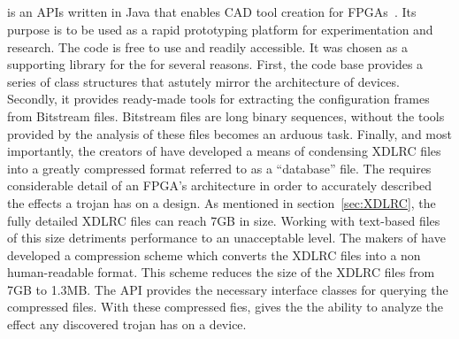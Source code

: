 \subsection{\RapidSmith} \label{sec:rapidSmith}
\RapidSmith is an \acrfull{APIs} written in Java that enables \acrfull{CAD} tool creation for \Xilinx \acrshort{FPGA}s~\cite{rapidSmith}.
Its purpose is to be used as a rapid prototyping platform for experimentation and research.
The code is free to use and readily accessible.
It was chosen as a supporting library for the \NameNoPeriod for several reasons.
First, the code base provides a series of class structures that astutely mirror the architecture of \Xilinx devices.
Secondly, it provides ready-made tools for extracting the configuration frames from \gls{Bitstream} files. 
\gls{Bitstream} files are long binary sequences, without the tools provided by \RapidSmith the analysis of these files becomes an arduous task.
Finally, and most importantly, the creators of \RapidSmith have developed a means of condensing XDLRC files into a greatly compressed format referred to as a ``database'' file.
The \NameNoPeriod requires considerable detail of an \acrshort{FPGA}'s architecture in order to accurately described the effects a trojan has on a design.
As mentioned in section~\ref{sec:XDLRC}, the fully detailed XDLRC files can reach 7GB in size.
Working with text-based files of this size detriments performance to an unacceptable level.
The makers of \RapidSmith have developed a compression scheme which converts the XDLRC files into a non human-readable format.
This scheme reduces the size of the XDLRC files from 7GB to 1.3MB. 
The \acrshort{API} provides the necessary interface classes for querying the compressed files.
With these compressed fies, \RapidSmith gives the \NameNoPeriod the ability to analyze the effect any discovered trojan has on a device.
